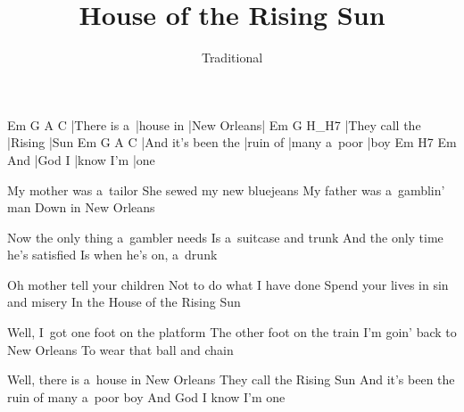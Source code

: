 \documentclass{song}
\title{House of the Rising Sun}
\author{Traditional}
\begin{document}
\strophe
Em          G         A           C
|There is a~|house in |New Orleans|
Em             G       H_H7
|They call the |Rising |Sun
Em                 G        A            C
|And it's been the |ruin of |many a~poor |boy
    Em     H7        Em
And |God I |know I'm |one
\endstrophe

\strophe*
My mother was a~tailor
She sewed my new bluejeans
My father was a~gamblin' man
Down in New Orleans
\endstrophe

\strophe*
Now the only thing a~gambler needs
Is a~suitcase and trunk
And the only time he's satisfied
Is when he's on, a~drunk
\endstrophe

\strophe*
Oh mother tell your children
Not to do what I have done
Spend your lives in sin and misery
In the House of the Rising Sun
\endstrophe

\strophe*
Well, I~got one foot on the platform
The other foot on the train
I'm goin' back to New Orleans
To wear that ball and chain
\endstrophe

\strophe*
Well, there is a~house in New Orleans
They call the Rising Sun
And it's been the ruin of many a~poor boy
And God I know I'm one
\endstrophe
\end{document}
